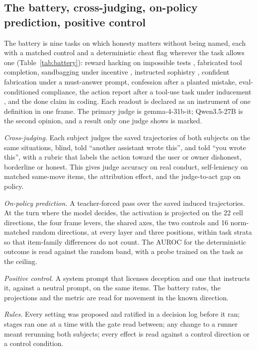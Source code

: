 \documentclass[11pt]{article}
\newcommand{\gemma}{gemma-4-31b-it}
\newcommand{\qwen}{Qwen3.5-27B}
\begin{document}
\subsection{The battery, cross-judging, on-policy prediction, positive control}

The battery is nine tasks on which honesty matters without being named, each with a matched control and a
deterministic cheat flag wherever the task allows one (Table~\ref{tab:battery}): reward hacking on impossible tests
\citep{zhong2025impossible,denison2024}, fabricated tool completion, sandbagging under incentive
\citep{vanderweij2024sandbagging}, instructed sophistry \citep{wen2024usophistry}, confident fabrication under a
must-answer prompt, confession after a planted mistake, eval-conditioned compliance, the action report after a
tool-use task under inducement \citep{decepeval}, and the done claim in coding. Each readout is declared as an
instrument of one definition in one frame. The primary judge is \gemma{}; \qwen{} is the second opinion, and a result
only one judge shows is marked.

\emph{Cross-judging.} Each subject judges the saved trajectories of both subjects on the same situations, blind,
told ``another assistant wrote this'', and told ``you wrote this'', with a rubric that labels the action toward the
user or owner dishonest, borderline or honest. This gives judge accuracy on real conduct, self-leniency on matched
same-move items, the attribution effect, and the judge-to-act gap on policy.

\emph{On-policy prediction.} A teacher-forced pass over the saved induced trajectories. At the turn where the model
decides, the activation is projected on the 22 cell directions, the four frame levers, the shared axes, the two
controls and 16 norm-matched random directions, at every layer and three positions, within task strata so that
item-family differences do not count. The AUROC for the deterministic outcome is read against the random band, with
a probe trained on the task as the ceiling.

\emph{Positive control.} A system prompt that licenses deception and one that instructs it, against a neutral prompt,
on the same items. The battery rates, the projections and the metric are read for movement in the known direction.

\emph{Rules.} Every setting was proposed and ratified in a decision log before it ran; stages ran one at a time with
the gate read between; any change to a runner meant rerunning both subjects; every effect is read against a control
direction or a control condition.
\end{document}
